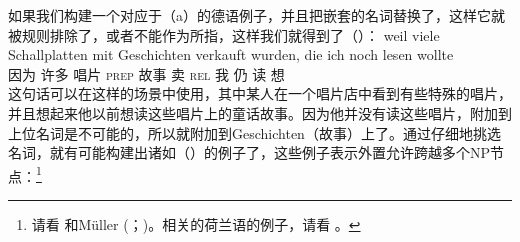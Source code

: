 如果我们构建一个对应于（a）的德语例子，并且把嵌套的名词替换了，这样它就被规则排除了，或者不能作为所指，这样我们就得到了（）：
\ea
\gll weil viele Schallplatten mit Geschichten verkauft wurden, die ich noch lesen wollte\\
	 因为 许多 唱片 \textsc{prep} 故事 卖 \passivepst{} \textsc{rel} 我 仍 读 想\\
\z
这句话可以在这样的场景中使用，其中某人在一个唱片店中看到有些特殊的唱片，并且想起来他以前想读这些唱片上的童话故事。因为他并没有读这些唱片，附加到上位名词是不可能的，所以就附加到Geschichten（故事）上了。通过仔细地挑选名词，就有可能构建出诸如（）的例子了，这些例子表示外置允许跨越多个NP节点：\footnote{%
请看 和Müller (\citeyear{Mueller2004d}；\citeyear[\S~3]{Mueller2007c})。相关的荷兰语的例子，请看 。
}

